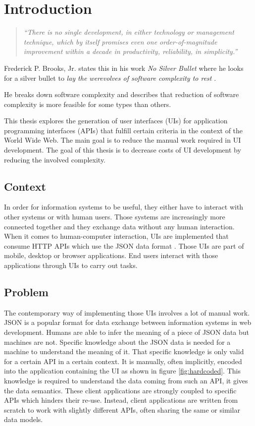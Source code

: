 \section{Introduction}\label{introduction}

\begin{quotation}
\textit{``There is no single development, in either technology or management technique, which by itself promises even one order-of-magnitude improvement within a decade in productivity, reliability, in simplicity.''} \citep[p.~1]{nosilverbullet}
\end{quotation}

Frederick P. Brooks, Jr. states this in his work \textit{No Silver Bullet} where he looks for a silver bullet to \textit{lay the werevolves of software complexity to rest} \citep[p.~1]{nosilverbullet}.

He breaks down software complexity and describes that reduction of software complexity is more feasible for some types than others.

This thesis explores the generation of user interfaces (UIs) for application programming interfaces (APIs) that fulfill certain criteria in the context of the World Wide Web. The main goal is to reduce the manual work required in UI development. The goal of this thesis is to decrease costs of UI development by reducing the involved complexity.

\subsection{Context}\label{context}
In order for information systems to be useful, they either have to interact with other systems or with human users. Those systems are increasingly more connected together and they exchange data without any human interaction. When it comes to human-computer interaction, UIs are implemented that consume HTTP APIs which use the JSON data format \citep{jsonformat}. Those UIs are part of mobile, desktop or browser applications. End users interact with those applications through UIs to carry out tasks.

\subsection{Problem}\label{problem}
The contemporary way of implementing those UIs involves a lot of manual work. JSON is a popular format for data exchange between information systems in web development. Humans are able to infer the meaning of a piece of JSON data but machines are not. Specific knowledge about the JSON data is needed for a machine to understand the meaning of it. That specific knowledge is only valid for a certain API in a certain context. It is manually, often implicitly, encoded into the application containing the UI as shown in figure \ref{fig:hardcoded}. This knowledge is required to understand the data coming from such an API, it gives the data semantics. These client applications are strongly coupled to specific APIs which hinders their re-use. Instead, client applications are written from scratch to work with slightly different APIs, often sharing the same or similar data models.

